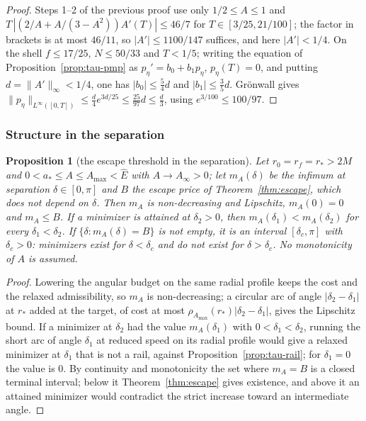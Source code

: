 \documentclass[aip,jmp,amsmath,amssymb,reprint]{revtex4-2}
\newcommand{\Ehat}{\hat E}
\theoremstyle{plain}
\newtheorem{proposition}{Proposition}[section]
\theoremstyle{definition}
\begin{document}
\begin{proof}
Steps 1--2 of the previous proof use only $1/2\le A\le1$ and
$T\,|(2/A+A/(3-A^2))A'(T)|\le46/7$ for $T\in[3/25,21/100]$; the factor in brackets is at most $46/11$, so
$|A'|\le1100/147$ suffices, and here $|A'|<1/4$. On the shell $f\le17/25$, $N\le50/33$ and $T<1/5$; writing
the equation of Proposition~\ref{prop:tau-pmp} as $p_\eta'=b_0+b_1p_\eta$, $p_\eta(T)=0$, and putting $d=\|A'\|_\infty<1/4$, one has
$|b_0|\le\frac54d$ and $|b_1|\le\frac35d$. Gr\"onwall gives
$\|p_\eta\|_{L^\infty([0,T])}\le\frac d4e^{3d/25}\le\frac{25}{97}d\le\frac d3$, using $e^{3/100}\le100/97$.
\end{proof}

\subsubsection*{Structure in the separation}
\begin{proposition}[the escape threshold in the separation]\label{prop:tau-var-delta}
Let $r_0=r_f=r_*>2M$ and $0<a_*\le A\le A_{\max}<\Ehat$ with $A\to A_\infty>0$; let $m_A(\delta)$ be the infimum
at separation $\delta\in[0,\pi]$ and $B$ the escape price of Theorem~\ref{thm:escape}, which does not depend on
$\delta$. Then $m_A$ is non-decreasing and Lipschitz, $m_A(0)=0$ and $m_A\le B$. If a minimizer is attained
at $\delta_2>0$, then $m_A(\delta_1)<m_A(\delta_2)$ for every $\delta_1<\delta_2$. If $\{\delta:m_A(\delta)=B\}$ is not empty,
it is an interval $[\delta_c,\pi]$ with $\delta_c>0$: minimizers exist for $\delta<\delta_c$ and do not exist for
$\delta>\delta_c$. No monotonicity of $A$ is assumed.
\end{proposition}

\begin{proof}
Lowering the angular budget on the same radial profile keeps the cost and the relaxed
admissibility, so $m_A$ is non-decreasing; a circular arc of angle $|\delta_2-\delta_1|$ at $r_*$ added at the
target, of cost at most $\rho_{A_{\max}}(r_*)|\delta_2-\delta_1|$, gives the Lipschitz bound. If a minimizer at
$\delta_2$ had the value $m_A(\delta_1)$ with $0<\delta_1<\delta_2$, running the short arc of angle $\delta_1$ at reduced
speed on its radial profile would give a relaxed minimizer at $\delta_1$ that is not a rail, against
Proposition~\ref{prop:tau-rail}; for $\delta_1=0$ the value is $0$. By continuity and monotonicity the set
where $m_A=B$ is a closed terminal interval; below it Theorem~\ref{thm:escape} gives existence, and above
it an attained minimizer would contradict the strict increase toward an intermediate angle.
\end{proof}
\end{document}
